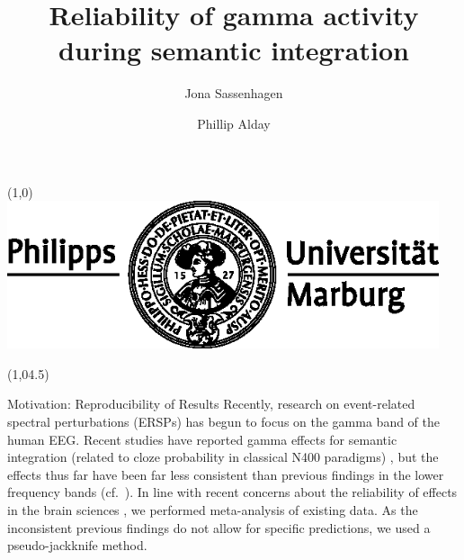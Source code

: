 \documentclass[final]{beamer}
\title{Reliability of gamma activity during semantic integration}
\author{Jona Sassenhagen \and Phillip Alday}
\institute{University of Marburg}
\date{}
\begin{document}
\begin{frame}{} 	
\begin{textblock}{15}(1,0)
\includegraphics[width=5in]{marburg-logo-blackwhite.eps}
\end{textblock}


\begin{textblock}{45}(1,04.5)
\begin{block}{Motivation: Reproducibility of Results}
Recently, research on event-related spectral perturbations (ERSPs) has begun to focus on the gamma band of the human EEG. Recent studies have reported gamma effects for semantic integration (related to cloze probability in classical N400 paradigms) \cite{mellemfriedmanmedvedev2013a,wangzhubastiaansen2012a,penolazziangrillijob2009a,hagoort2008a,hagoorthaldbastiaansen2004a}, but the effects thus far have been far less consistent than previous findings in the lower frequency bands (cf.~\cite{bastiaansenhagoort2006a,heinetammhofmann2006a,rohmklimeschhaider2001a,davidsonindefrey2007a,roehmschlesewskybornkessel2004a}).
In line with recent concerns about the reliability of effects in the brain sciences \cite{vulharriswinkielman2009a,simmonsnelsonsimonsohn2011a,kilner2013a}, we performed meta-analysis of existing data. As the inconsistent previous findings do not allow for specific predictions, we used a pseudo-jackknife method.
\end{block}


\end{textblock}
\end{frame}
\end{document}
